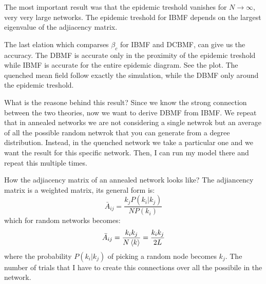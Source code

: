 \documentclass[../main/main.tex]{subfiles}
\begin{document}

The most important result was that the epidemic treshold vanishes for \( N \rightarrow \infty  \), very very large networks.
The epidemic treshold for IBMF depends on the largest eigenvalue of the adjiacency matrix.




The last elation which comparses \( \beta _c \) for IBMF and DCBMF, can give us the accuracy. The DBMF is accurate only in the proximity of the epidemic treshold while IBMF is accurate for the entire epidemic diagram. See the plot.
The quenched mean field follow exactly the simulation, while the DBMF only around the epidemic treshold.

What is the reasone behind this result? Since we know the strong connection between the two theories, now we want to derive DBMF from IBMF. We repeat that in annealed networks we are not considering a single netwrok but an average of all the possible random netwrok that you can generate from a degree distribution. Instead, in the quenched network we take a particular one and we want the result for this specific network. Then, I can run my model there and repeat this multiple times.

How the adjiacency matrix of an annealed network looks like? The adjiancency matrix is a weighted matrix, its general form is:
\begin{equation*}
  \bar{A}_{ij} = \frac{k_j P(k_i|k_j)}{N P (k_i)}
\end{equation*}
which for random networks becomes:
\begin{equation*}
  \bar{A}_{ij} = \frac{k_i k_j}{N \expval{k} } = \frac{k_i k_j}{2 L}
\end{equation*}
where the probability  \(  P(k_i|k_j) \) of picking a random node becomes \( k_j \). The number of trials that I have to create this connections over all the possibile in the network.
\end{document}
